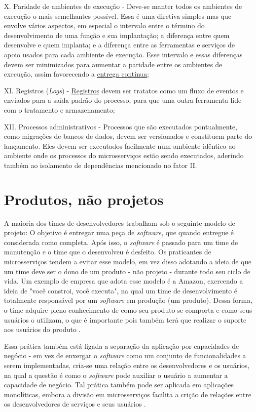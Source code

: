 X. Paridade de ambientes de execução - Deve-se manter todos os ambientes de execução o mais semelhantes possível. Essa é uma diretiva simples mas que envolve vários aspectos, em especial o intervalo entre o término do desenvolvimento de uma função e sua implantação; a diferença entre quem desenvolve e quem implanta; e a diferença entre as ferramentas e serviços de apoio usados para cada ambiente de execução. Esse intervalo e essas diferenças devem ser minimizados para aumentar a paridade entre os ambientes de execução, assim favorecendo a \hyperref[secao-cicd]{entrega contínua};

XI. Registros (\emph{Logs}) - \hyperref[subsecao-registros]{Registros} devem ser tratatos como um fluxo de eventos e enviados para a saída padrão do processo, para que uma outra ferramenta lide com o tratamento e armazenamento;

XII. Processos administrativos - Processos que são executados pontualmente, como migrações de bancos de dados, devem ser versionados e constituem parte do lançamento. Eles devem ser executados facilmente num ambiente idêntico ao ambiente onde os processos do microsserviços estão sendo executados, aderindo também ao isolamento de dependências mencionado no fator II.

\section{Produtos, não projetos}

A maioria dos times de desenvolvedores trabalham sob o seguinte modelo de projeto: O objetivo é entregar uma peça de \emph{software}, que quando entregue é considerada como completa. Após isso, o \emph{software} é passado para um time de manutenção e o time que o desenvolveu é desfeito. Os praticantes de microsserviços tendem a evitar esse modelo, em vez disso adotando a ideia de que um time deve ser o dono de um produto - não projeto - durante todo seu ciclo de vida. Um exemplo de empresa que adota esse modelo é a Amazon, exercendo a ideia de "você constroi, você executa", na qual um time de desenvolvimento é totalmente responsável por um \emph{software} em produção (um produto). Dessa forma, o time adquire pleno conhecimento de como seu produto se comporta e como seus usuários o utilizam, o que é importante pois também terá que realizar o suporte aos usuários do produto \cite{martin-fowler-microservices}. 

Essa prática também está ligada a separação da aplicação por capacidades de negócio - em vez de enxergar o \emph{software} como um conjunto de funcionalidades a serem implementadas, cria-se uma relação entre os desenvolvedores e os usuários, na qual a questão é como o \emph{software} pode auxiliar o usuário a aumentar a capacidade de negócio. Tal prática também pode ser aplicada em aplicações monolíticas, embora a divisão em microsserviços facilita a crição de relações entre os desenvolvedores de serviços e seus usuários \cite{martin-fowler-microservices}.

